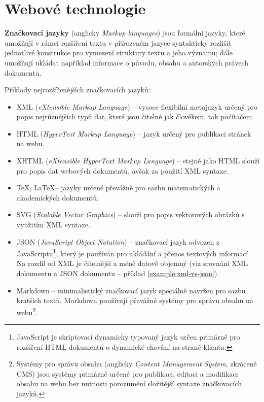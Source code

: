 \chapter{Webové technologie}
\label{chap:languages}

\textbf{Značkovací jazyky} (anglicky \textit{Markup languages}) jsou formální jazyky, které umožňují v rámci rozšíření textu v přirozeném jazyce syntakticky rozlišit jednotlivé konstrukce pro vymezení struktury textu a jeho významu; dále umožňují ukládat například informace o původu, obsahu a autorských právech dokumentu. \cite{14} \cite{16}

Příklady nejrozšířenějších značkovacích jazyků:

\begin{itemize}
    \item XML (\textit{eXtensible Markup Language}) -- vysoce flexibilní metajazyk určený pro popis nejrůznějších typů dat, které jsou čitelné jak člověkem, tak počítačem.
    \item HTML (\textit{HyperText Markup Language}) -- jazyk určený pro publikaci stránek na webu.
    \item XHTML (\textit{eXtensible HyperText Markup Language}) -- stejně jako HTML slouží pro popis dat webových dokumentů, avšak za použití XML syntaxe.
    \item \TeX, \LaTeX -- jazyky určené převážně pro sazbu matematických a akademických dokumentů.
    \item SVG (\textit{Scalable Vector Graphics}) -- slouží pro popis vektorových obrázků s využitím XML syntaxe.
    \item JSON (\textit{JavaScript Object Notation}) -- značkovací jazyk odvozen z JavaScriptu\footnote{JavaScript je skriptovací dynamicky typovaný jazyk určen primárně pro rozšíření HTML dokumentu o dynamické chování na straně klienta.}, který je používán pro ukládání a přenos textových informací. Na rozdíl od XML je čitelnější a méně datově objemný (viz srovnání XML dokumentu a JSON dokumentu -- příklad \ref{example:xml-vs-json}).
    \item Markdown -- minimalistický značkovací jazyk speciálně navržen pro sazbu kratších textů. Markdown používají převážně systémy pro správu obsahu na webu\footnote{Systémy pro správu obsahu (anglicky \textit{Content Management System}, zkráceně CMS) jsou systémy primárně určené pro publikaci, editaci a modifikaci obsahu na webu bez nutnosti porozumění složitější syntaxe značkovacích jazyků.}.
\end{itemize}

